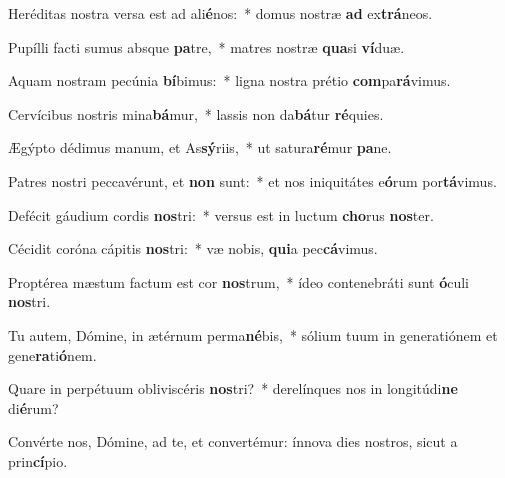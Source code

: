 \item Heréditas nostra versa est ad ali\textbf{é}nos:~* domus nostræ \textbf{ad} ex\textbf{trá}neos.
\item Pupílli facti sumus absque \textbf{pa}tre,~* matres nostræ \textbf{qua}si \textbf{ví}duæ.
\item Aquam nostram pecúnia \textbf{bí}bimus:~* ligna nostra prétio \textbf{com}pa\textbf{rá}vimus.
\item Cervícibus nostris mina\textbf{bá}mur,~* lassis non da\textbf{bá}tur \textbf{ré}quies.
\item Ægýpto dédimus manum, et As\textbf{sý}riis,~* ut satura\textbf{ré}mur \textbf{pa}ne.
\item Patres nostri peccavérunt, et \textbf{non} sunt:~* et nos iniquitátes e\textbf{ó}rum por\textbf{tá}vimus.
\item Defécit gáudium cordis \textbf{nos}tri:~* versus est in luctum \textbf{cho}rus \textbf{nos}ter.
\item Cécidit coróna cápitis \textbf{nos}tri:~* væ nobis, \textbf{qui}a pec\textbf{cá}vimus.
\item Proptérea mæstum factum est cor \textbf{nos}trum,~* ídeo contenebráti sunt \textbf{ó}culi \textbf{nos}tri.
\item Tu autem, Dómine, in ætérnum perma\textbf{né}bis,~* sólium tuum in generatiónem et gene\textbf{ra}ti\textbf{ó}nem.
\item Quare in perpétuum obliviscéris \textbf{nos}tri?~* derelínques nos in longitúdi\textbf{ne} di\textbf{é}rum?
\item Convérte nos, Dómine, ad te, et convertémur: ínnova dies nostros, sicut a prin\textbf{cí}pio.

